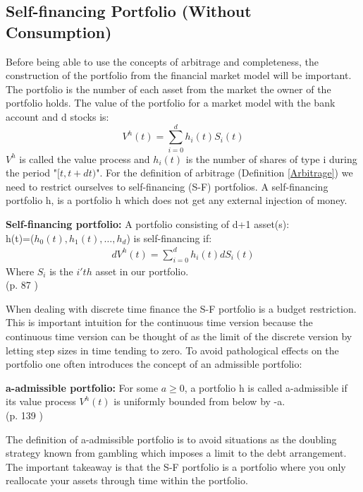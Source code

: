 \subsection{Self-financing Portfolio (Without Consumption)}
Before being able to use the concepts of arbitrage and completeness, the construction of the portfolio from the financial market model will be important. The portfolio is the number of each asset from the market the owner of the portfolio holds. The value of the portfolio for a market model with the bank account and d stocks is:
\begin{equation*}
V^h(t)=\sum_{i=0}^{d} h_{i}(t) S_i(t)
\end{equation*}
$V^h$ is called the value process and $h_i(t)$ is the number of shares of type i during the period "$[t,t+dt)$". For the definition of arbitrage (Definition \ref{Arbitrage}) we need to restrict ourselves to self-financing (S-F) portfolios. A self-financing portfolio h, is a portfolio h which does not get any external injection of money.
\theoremstyle{definition}
\begin{definition}{\textbf{Self-financing portfolio: }}
A portfolio consisting of d+1 asset(s): \\
h(t)=($h_0(t),h_1(t), \dotsc, h_{d}$) is self-financing if:
\begin{equation*}\label{SF}
\begin{split}
dV^{h}(t)=\sum_{i=0}^{d} h_{i}(t) dS_{i}(t)
\end{split}
\end{equation*}
Where $S_{i}$ is the $i'th$ asset in our portfolio.\\ \null \hfill (p. 87 \parencite{finKont})
\end{definition}
When dealing with discrete time finance the S-F portfolio is a budget restriction. This is important intuition for the continuous time version because the continuous time version can be thought of as the limit of the discrete version by letting step sizes in time tending to zero. To avoid pathological effects on the portfolio one often introduces the concept of an admissible portfolio:
\theoremstyle{definition}
\begin{definition}{\textbf{a-admissible portfolio: }}
For some $a\geq 0$, a portfolio h is called a-admissible if its value process $V^h(t)$ is uniformly bounded from below by -a.\\
\null \hfill (p. 139 \parencite{finKont})
\end{definition}
The definition of a-admissible portfolio is to avoid situations as the doubling strategy known from gambling which imposes a limit to the debt arrangement. The important takeaway is that the S-F portfolio is a portfolio where you only reallocate your assets through time within the portfolio.

